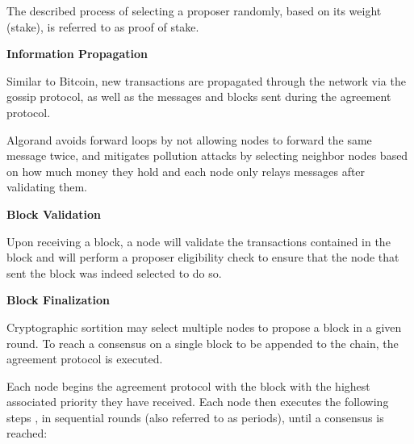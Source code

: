 The described process of selecting a proposer randomly, based on its weight (stake), is referred to as proof of stake.


\vspace{0.25cm}


\textbf{Information Propagation}

Similar to Bitcoin, new transactions are propagated through the network via the gossip protocol, as well as the messages and blocks sent during the agreement protocol.

Algorand avoids forward loops by not allowing nodes to forward the same message twice, and mitigates pollution attacks by selecting neighbor nodes based on how much money they hold and each node only relays messages after validating them.


\vspace{0.25cm}

\textbf{Block Validation}

Upon receiving a block, a node will validate the transactions contained in the block and will perform a proposer eligibility check to ensure that the node that sent the block was indeed selected to do so.

\vspace{0.25cm}

\textbf{Block Finalization}

Cryptographic sortition may select multiple nodes to propose a block in a given round. To reach a consensus on a single block to be appended to the chain, the agreement protocol is executed.

Each node begins the agreement protocol with the block with the highest associated priority they have received. Each node then executes the following steps \cite{algorand_agreement}, in sequential rounds (also referred to as periods), until a consensus is reached:

